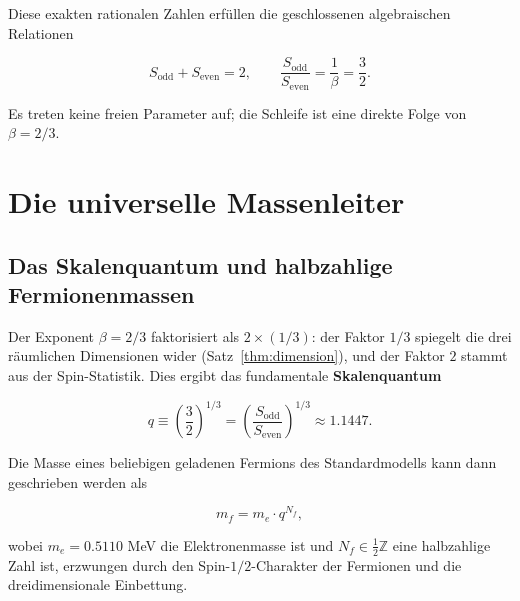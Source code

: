 \documentclass[12pt,a4paper]{article}
\theoremstyle{remark}
\begin{document}
	Diese exakten rationalen Zahlen erfüllen die geschlossenen algebraischen
	Relationen
	
	\begin{equation}
		\boxed{S_{\mathrm{odd}} + S_{\mathrm{even}} = 2, \qquad
			\frac{S_{\mathrm{odd}}}{S_{\mathrm{even}}} = \frac{1}{\beta} = \frac{3}{2}}.
		\label{eq:algebraic-loop}
	\end{equation}
	
	Es treten keine freien Parameter auf; die Schleife ist eine direkte Folge von
	\(\beta = 2/3\).
	
	\section{Die universelle Massenleiter}
	\label{sec:mass-ladder}
	
	\subsection{Das Skalenquantum und halbzahlige Fermionenmassen}
	
	Der Exponent \(\beta = 2/3\) faktorisiert als \(2 \times (1/3)\): der Faktor
	\(1/3\) spiegelt die drei räumlichen Dimensionen wider (Satz~\ref{thm:dimension}),
	und der Faktor \(2\) stammt aus der Spin-Statistik. Dies ergibt das fundamentale
	\textbf{Skalenquantum}
	
	\begin{equation}
		q \equiv \left(\frac{3}{2}\right)^{1/3}
		= \left(\frac{S_{\mathrm{odd}}}{S_{\mathrm{even}}}\right)^{1/3} \approx 1.1447.
	\end{equation}
	
	Die Masse eines beliebigen geladenen Fermions des Standardmodells kann dann
	geschrieben werden als
	
	\begin{equation}
		\boxed{m_f = m_e \cdot q^{N_f}},
		\label{eq:mass-quantization}
	\end{equation}
	
	wobei \(m_e = 0.5110\) MeV die Elektronenmasse ist und \(N_f \in \frac{1}{2}\mathbb{Z}\)
	eine halbzahlige Zahl ist, erzwungen durch den Spin-\(1/2\)-Charakter der
	Fermionen und die dreidimensionale Einbettung.
	
\end{document}
